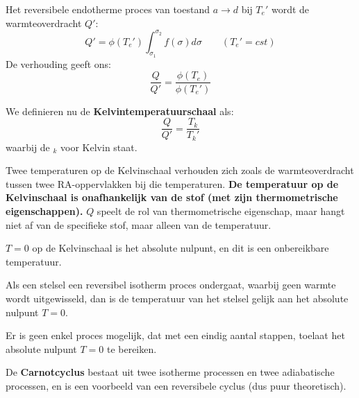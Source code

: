 Het reversibele endotherme proces van toestand \(a \to d \) bij \(T_e'\) wordt de warmteoverdracht \(Q'\):
\[
Q' = \phi(T_e') \int_{\sigma_1}^{\sigma_2}f(\sigma)d\sigma  \qquad (T_e' = cst)
\]
De verhouding geeft ons:
\[\frac{Q}{Q'} = \frac{\phi(T_e)}{\phi(T_e')}\]

We definieren nu de \textbf{Kelvintemperatuurschaal} als:
\begin{equation}
    \label{eq:Kelvintemp}
    \frac{Q}{Q'} = \frac{T_k}{T_k'}
\end{equation}
waarbij de \(_k\) voor Kelvin staat.

Twee temperaturen op de Kelvinschaal verhouden zich zoals de warmteoverdracht tussen twee RA-oppervlakken bij die temperaturen.
\textbf{De temperatuur op de Kelvinschaal is onafhankelijk van de stof (met zijn thermometrische eigenschappen).}
\(Q\) speelt de rol van thermometrische eigenschap, maar hangt niet af van de specifieke stof, maar alleen van de temperatuur.

\(T=0\) op de Kelvinschaal is het absolute nulpunt, en dit is een onbereikbare temperatuur.
\begin{postulate}
    Als een stelsel een reversibel isotherm proces ondergaat, waarbij geen warmte wordt uitgewisseld, dan is de temperatuur van het stelsel gelijk aan het absolute nulpunt \(T=0\).
\end{postulate}

\begin{postulate}
    Er is geen enkel proces mogelijk, dat met een eindig aantal stappen, toelaat het absolute nulpunt \(T=0\) te bereiken.
\end{postulate}

De \textbf{Carnotcyclus} bestaat uit twee isotherme processen en twee adiabatische processen, en is een voorbeeld van een reversibele cyclus (dus puur theoretisch).

